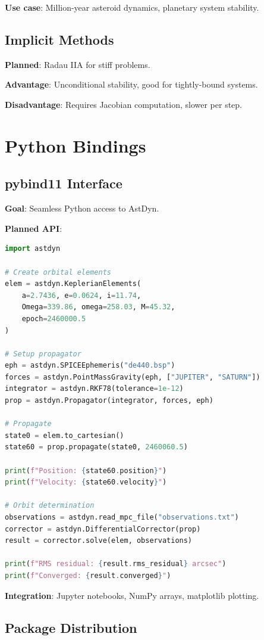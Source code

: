\textbf{Use case}: Million-year asteroid dynamics, planetary system stability.

\subsection{Implicit Methods}

\textbf{Planned}: Radau IIA for stiff problems.

\textbf{Advantage}: Unconditional stability, good for tightly-bound systems.

\textbf{Disadvantage}: Requires Jacobian computation, slower per step.

\section{Python Bindings}

\subsection{pybind11 Interface}

\textbf{Goal}: Seamless Python access to AstDyn.

\textbf{Planned API}:
\begin{lstlisting}[language=Python]
import astdyn

# Create orbital elements
elem = astdyn.KeplerianElements(
    a=2.7436, e=0.0624, i=11.74,
    Omega=339.86, omega=258.03, M=45.32,
    epoch=2460000.5
)

# Setup propagator
eph = astdyn.SPICEEphemeris("de440.bsp")
forces = astdyn.PointMassGravity(eph, ["JUPITER", "SATURN"])
integrator = astdyn.RKF78(tolerance=1e-12)
prop = astdyn.Propagator(integrator, forces, eph)

# Propagate
state0 = elem.to_cartesian()
state60 = prop.propagate(state0, 2460060.5)

print(f"Position: {state60.position}")
print(f"Velocity: {state60.velocity}")

# Orbit determination
observations = astdyn.read_mpc_file("observations.txt")
corrector = astdyn.DifferentialCorrector(prop)
result = corrector.solve(elem, observations)

print(f"RMS residual: {result.rms_residual} arcsec")
print(f"Converged: {result.converged}")
\end{lstlisting}

\textbf{Integration}: Jupyter notebooks, NumPy arrays, matplotlib plotting.

\subsection{Package Distribution}

